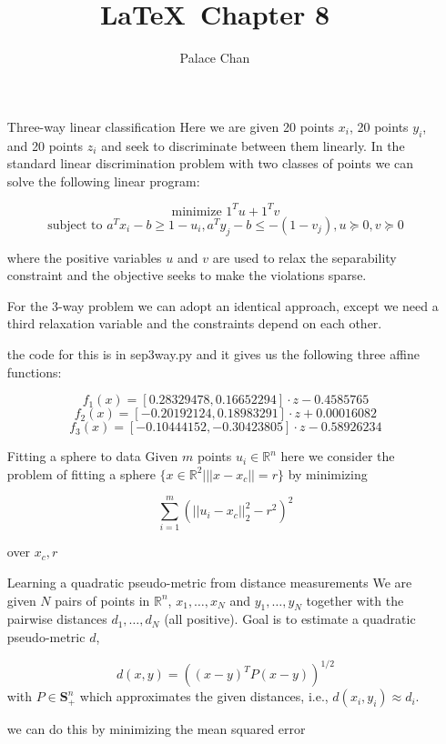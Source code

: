 \documentclass[12pt]{article}
\title{\LaTeX\ Chapter 8}
\author{Palace Chan}
\begin{document}
\maketitle
\newpage

\begin{itemize}

\item[Three-way linear classification]
  Here we are given 20 points $x_i$, 20 points $y_i$, and 20 points $z_i$ and seek to discriminate between them linearly. In the standard linear discrimination problem with two classes of points we can solve the following linear program:

  $$\text{minimize } 1^T u + 1^T v$$
  $$\text{subject to } a^T x_i - b \geq 1 - u_i, a^T y_j - b \leq -(1 - v_j), u \succeq 0, v \succeq 0$$

  where the positive variables $u$ and $v$ are used to relax the separability constraint and the objective seeks to make the violations sparse.

  For the 3-way problem we can adopt an identical approach, except we need a third relaxation variable and the constraints depend on each other.

  the code for this is in sep3way.py and it gives us the following three affine functions:

  $$f_1(x) = [0.28329478, 0.16652294] \cdot z - 0.4585765$$
  $$f_2(x) = [-0.20192124, 0.18983291] \cdot z + 0.00016082$$
  $$f_3(x) = [-0.10444152, -0.30423805] \cdot z - 0.58926234$$
  
\item[Fitting a sphere to data]
  Given $m$ points $u_i \in \mathbb{R}^n$ here we consider the problem of fitting a sphere $\{x \in \mathbb{R}^2 | ||x - x_c|| = r\}$ by minimizing

  $$\sum_{i=1}^m \left(||u_i - x_c ||_2^2 - r^2\right)^2$$

  over $x_c, r$
  

\item[Learning a quadratic pseudo-metric from distance measurements]
  We are given $N$ pairs of points in $\mathbb{R}^n$, $x_1, \ldots, x_N$ and $y_1, \ldots, y_N$ together with the pairwise distances $d_1, \ldots, d_N$ (all positive). Goal is to estimate a quadratic pseudo-metric $d$,

  $$d(x,y) = \left( (x-y)^T P (x-y) \right)^{1/2}$$
  with $P \in \textbf{S}_+^n$ which approximates the given distances, i.e., $d(x_i, y_i) \approx d_i$.

  we can do this by minimizing the mean squared error


\end{itemize}
\end{document}
